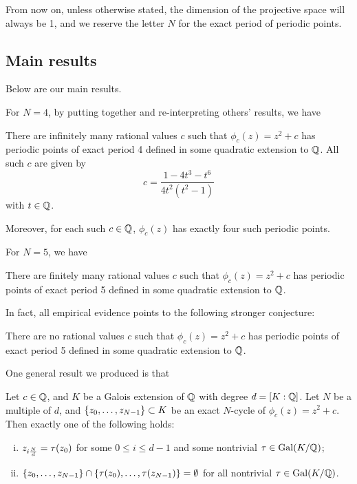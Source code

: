 From now on, unless otherwise stated, the dimension of the projective
space will always be 1, and we reserve the letter $N$ for the exact
period of periodic points.

\subsection{Main results}
\label{subsec:results}

Below are our main results.

For $N = 4$, by putting together and re-interpreting others' results,
we have

\begin{theorem}
  \label{th:n=4-infinite}
  There are infinitely many rational values $c$ such that $\phi_c(z) =
  z^2 + c$ has periodic points of exact period 4 defined in some
  quadratic extension to $\mathbb{Q}$. All such $c$ are given by
  \[
  c = \frac{1 - 4t^3 - t^6}{4t^2(t^2 - 1)}
  \]
  with $t \in \mathbb{Q}$.

  Moreover, for each such $c \in \mathbb{Q}$, $\phi_c(z)$ has exactly four
  such periodic points.
\end{theorem}

For $N = 5$, we have

\begin{theorem}
  \label{th:n=5-finite}
  There are finitely many rational values $c$ such that $\phi_c(z) =
  z^2 + c$ has periodic points of exact period 5 defined in some
  quadratic extension to $\mathbb{Q}$.
\end{theorem}

In fact, all empirical evidence points to the following stronger
conjecture:

\begin{conjecture}
  \label{cj:n=5-zero}
  There are no rational values $c$ such that $\phi_c(z) = z^2 + c$ has
  periodic points of exact period 5 defined in some quadratic
  extension to $\mathbb{Q}$.
\end{conjecture}

One general result we produced is that

\begin{theorem}
  Let $c \in \mathbb{Q}$, and $K$ be a Galois extension of $\mathbb{Q}$ with degree $d
  = [K : \mathbb{Q}]$. Let $N$ be a multiple of $d$, and $\left\{z_0, \dots,
    z_{N-1}\right\} \subset K$ be an exact $N$-cycle of $\phi_c(z) = z^2 +
  c$. Then exactly one of the following holds:
  \begin{enumerate}[(i)]
  \item $z_{i\frac{N}{d}} = \tau(z_0)$ for some $0 \le i \le d-1$ and
    some nontrivial $\tau \in \mathrm{Gal}(K/\mathbb{Q})$;

  \item $\left\{z_0, \dots, z_{N-1}\right\} \cap \left\{\tau(z_0), \dots, \tau(z_{N-1})\right\} =
    \emptyset$ for all nontrivial $\tau \in \mathrm{Gal}(K/\mathbb{Q})$.
  \end{enumerate}
\end{theorem}

